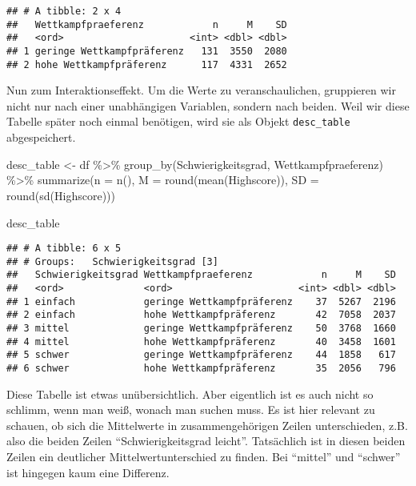 \documentclass[
]{book}
\newenvironment{Shaded}{\begin{snugshade}}{\end{snugshade}}
\newcommand{\AttributeTok}[1]{\textcolor[rgb]{0.77,0.63,0.00}{#1}}
\newcommand{\FunctionTok}[1]{\textcolor[rgb]{0.00,0.00,0.00}{#1}}
\newcommand{\NormalTok}[1]{#1}
\newcommand{\OtherTok}[1]{\textcolor[rgb]{0.56,0.35,0.01}{#1}}
\newcommand{\SpecialCharTok}[1]{\textcolor[rgb]{0.00,0.00,0.00}{#1}}
\begin{document}
\begin{verbatim}
## # A tibble: 2 x 4
##   Wettkampfpraeferenz            n     M    SD
##   <ord>                      <int> <dbl> <dbl>
## 1 geringe Wettkampfpräferenz   131  3550  2080
## 2 hohe Wettkampfpräferenz      117  4331  2652
\end{verbatim}

Nun zum Interaktionseffekt. Um die Werte zu veranschaulichen, gruppieren wir nicht nur nach einer unabhängigen Variablen, sondern nach beiden. Weil wir diese Tabelle später noch einmal benötigen, wird sie als Objekt \texttt{desc\_table} abgespeichert.

\begin{Shaded}
\begin{Highlighting}[]
\NormalTok{desc\_table }\OtherTok{\textless{}{-}}\NormalTok{ df }\SpecialCharTok{\%\textgreater{}\%} 
  \FunctionTok{group\_by}\NormalTok{(Schwierigkeitsgrad, Wettkampfpraeferenz) }\SpecialCharTok{\%\textgreater{}\%} 
  \FunctionTok{summarize}\NormalTok{(}\AttributeTok{n =} \FunctionTok{n}\NormalTok{(), }
            \AttributeTok{M =} \FunctionTok{round}\NormalTok{(}\FunctionTok{mean}\NormalTok{(Highscore)),}
            \AttributeTok{SD =} \FunctionTok{round}\NormalTok{(}\FunctionTok{sd}\NormalTok{(Highscore)))}

\NormalTok{desc\_table }
\end{Highlighting}
\end{Shaded}

\begin{verbatim}
## # A tibble: 6 x 5
## # Groups:   Schwierigkeitsgrad [3]
##   Schwierigkeitsgrad Wettkampfpraeferenz            n     M    SD
##   <ord>              <ord>                      <int> <dbl> <dbl>
## 1 einfach            geringe Wettkampfpräferenz    37  5267  2196
## 2 einfach            hohe Wettkampfpräferenz       42  7058  2037
## 3 mittel             geringe Wettkampfpräferenz    50  3768  1660
## 4 mittel             hohe Wettkampfpräferenz       40  3458  1601
## 5 schwer             geringe Wettkampfpräferenz    44  1858   617
## 6 schwer             hohe Wettkampfpräferenz       35  2056   796
\end{verbatim}

Diese Tabelle ist etwas unübersichtlich. Aber eigentlich ist es auch nicht so schlimm, wenn man weiß, wonach man suchen muss. Es ist hier relevant zu schauen, ob sich die Mittelwerte in zusammengehörigen Zeilen unterschieden, z.B. also die beiden Zeilen ``Schwierigkeitsgrad leicht''. Tatsächlich ist in diesen beiden Zeilen ein deutlicher Mittelwertunterschied zu finden. Bei ``mittel'' und ``schwer'' ist hingegen kaum eine Differenz.
\end{document}
